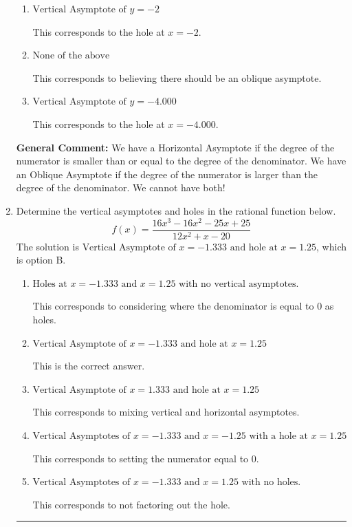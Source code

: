 \documentclass{extbook}[14pt]
\newcommand{\litem}[1]{\item #1

\rule{\textwidth}{0.4pt}}
\begin{document}
\begin{enumerate}
{\begin{enumerate}[label=\Alph*.]
This corresponds to using the rule for Horizontal Asymptote when the degree of the denominator is larger than the numerator.
\item \( \text{Vertical Asymptote of } y = -2  \)

This corresponds to the hole at $x = -2$.
\item \( \text{None of the above} \)

This corresponds to believing there should be an oblique asymptote.
\item \( \text{Vertical Asymptote of } y = -4.000  \)

This corresponds to the hole at $x = -4.000$.
\end{enumerate}

\textbf{General Comment:} We have a Horizontal Asymptote if the degree of the numerator is smaller than or equal to the degree of the denominator. We have an Oblique Asymptote if the degree of the numerator is larger than the degree of the denominator. We cannot have both!
}
\litem{
Determine the vertical asymptotes and holes in the rational function below.
\[ f(x) = \frac{16x^{3} -16 x^{2} -25 x + 25}{12x^{2} +x -20} \]The solution is \( \text{Vertical Asymptote of } x = -1.333 \text{ and hole at } x = 1.25 \), which is option B.\begin{enumerate}[label=\Alph*.]
\item \( \text{Holes at } x = -1.333 \text{ and } x = 1.25 \text{ with no vertical asymptotes.} \)

This corresponds to considering where the denominator is equal to 0 as holes.
\item \( \text{Vertical Asymptote of } x = -1.333 \text{ and hole at } x = 1.25 \)

This is the correct answer.
\item \( \text{Vertical Asymptote of } x = 1.333 \text{ and hole at } x = 1.25 \)

This corresponds to mixing vertical and horizontal asymptotes.
\item \( \text{Vertical Asymptotes of } x = -1.333 \text{ and } x = -1.25 \text{ with a hole at } x = 1.25 \)

This corresponds to setting the numerator equal to 0.
\item \( \text{Vertical Asymptotes of } x = -1.333 \text{ and } x = 1.25 \text{ with no holes.} \)

This corresponds to not factoring out the hole.
\end{enumerate}

}
\end{enumerate}
\end{document}
